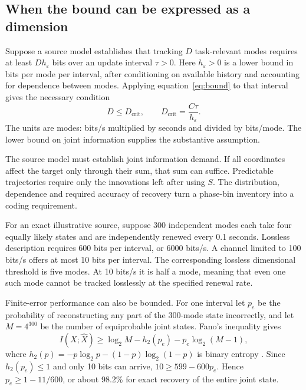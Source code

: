 \documentclass[11pt,a4paper]{article}
\begin{document}
\subsection{When the bound can be expressed as a dimension}

Suppose a source model establishes that tracking \(D\) task-relevant modes requires at least \(D h_\varepsilon\) bits over an update interval \(\tau>0\). Here \(h_\varepsilon>0\) is a lower bound in bits per mode per interval, after conditioning on available history and accounting for dependence between modes. Applying equation~\eqref{eq:bound} to that interval gives the necessary condition
\begin{equation}
 D\leq D_{\mathrm{crit}},
 \qquad
 D_{\mathrm{crit}}=\frac{C\tau}{h_\varepsilon}.
 \label{eq:dcrit}
\end{equation}
The units are modes: bits/s multiplied by seconds and divided by bits/mode. The lower bound on joint information supplies the substantive assumption.

The source model must establish joint information demand. If all coordinates affect the target only through their sum, that sum can suffice. Predictable trajectories require only the innovations left after using \(S\). The distribution, dependence and required accuracy of recovery turn a phase-bin inventory into a coding requirement.

For an exact illustrative source, suppose 300 independent modes each take four equally likely states and are independently renewed every 0.1 seconds. Lossless description requires 600 bits per interval, or 6000 bits/s. A channel limited to 100 bits/s offers at most 10 bits per interval. The corresponding lossless dimensional threshold is five modes. At 10 bits/s it is half a mode, meaning that even one such mode cannot be tracked losslessly at the specified renewal rate.

Finite-error performance can also be bounded. For one interval let \(p_e\) be the probability of reconstructing any part of the 300-mode state incorrectly, and let \(M=4^{300}\) be the number of equiprobable joint states. Fano's inequality gives
\begin{equation}
 I(X;\widehat X)\geq
 \log_2 M-h_2(p_e)-p_e\log_2(M-1),
 \label{eq:fano}
\end{equation}
where \(h_2(p)=-p\log_2 p-(1-p)\log_2(1-p)\) is binary entropy \citep{cover2006}. Since \(h_2(p_e)\leq1\) and only 10 bits can arrive, \(10\geq599-600p_e\). Hence \(p_e\geq 1-11/600\), or about 98.2\% for exact recovery of the entire joint state.
\end{document}
